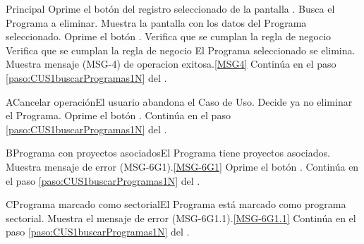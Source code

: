 	\begin{UCtrayectoria}{Principal}
                        \UCpaso[\UCactor] Oprime el bot\'on  del registro seleccionado de la pantalla .
                        \UCpaso [\UCactor] Busca el Programa a eliminar.
			\UCpaso Muestra la pantalla  con los datos del Programa seleccionado.
			\UCpaso [\UCactor] Oprime el bot\'on . 
                        \UCpaso Verifica que se cumplan la regla de negocio  
			\UCpaso Verifica que se cumplan la regla de negocio  
			\UCpaso El Programa seleccionado se elimina.
                        \UCpaso Muestra mensaje (MSG-4) de operacion exitosa.\ref{MSG4}
			\UCpaso Contin\'ua en el paso \ref{paso:CUS1buscarProgramas1N} del .
	\end{UCtrayectoria}

		\begin{UCtrayectoriaA}{A}{Cancelar operaci\'on}{El usuario abandona el Caso de Uso.}
			\UCpaso[\UCactor] Decide ya no eliminar el Programa. \label{Datos_Asoc_Equipo}
			\UCpaso[\UCactor] Oprime el bot\'on .
			\UCpaso Contin\'ua en el paso \ref{paso:CUS1buscarProgramas1N} del .
		\end{UCtrayectoriaA}

                \begin{UCtrayectoriaA}{B}{Programa con proyectos asociados}{El Programa tiene proyectos asociados.}
			\UCpaso Muestra mensaje de error (MSG-6G1).\ref{MSG-6G1} \label{Datos_Asoc_Equipo}
			\UCpaso[\UCactor] Oprime el bot\'on .
			\UCpaso Contin\'ua en el paso \ref{paso:CUS1buscarProgramas1N} del .
		\end{UCtrayectoriaA}
		
		\begin{UCtrayectoriaA}{C}{Programa marcado como sectorial}{El Programa est\'a marcado como programa sectorial.}
			\UCpaso Muestra el mensaje de error (MSG-6G1.1).\ref{MSG-6G1.1}
			\UCpaso Contin\'ua en el paso \ref{paso:CUS1buscarProgramas1N} del .
		\end{UCtrayectoriaA}
